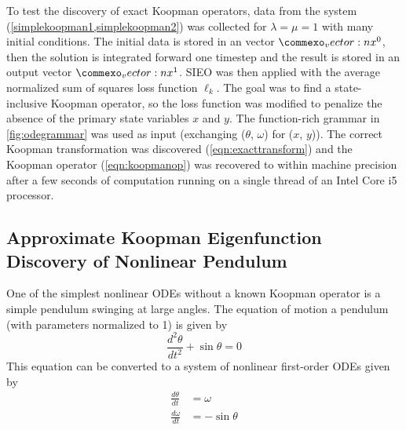 \documentclass{article}
\renewcommand{\vec}[1]{\vect{#1}}
\begin{document}
To test the discovery of exact Koopman operators, data from the system (\cref{simplekoopman1,simplekoopman2}) was collected for $\lambda = \mu = 1$ with many initial conditions. The initial data is stored in an vector $\vec{x}^0$, then the solution is integrated forward one timestep and the result is stored in an output vector $\vec{x}^1$. SIEO was then applied with the average normalized sum of squares loss function $\ell_k$. The goal was to find a state-inclusive Koopman operator, so the loss function was modified to penalize the absence of the primary state variables $x$ and $y$. The function-rich grammar in \cref{fig:odegrammar} was used as input (exchanging ($\theta$, $\omega$) for ($x$, $y$)). The correct Koopman transformation was discovered (\cref{eqn:exacttransform}) and the Koopman operator (\cref{eqn:koopmanop}) was recovered to within machine precision after a few seconds of computation running on a single thread of an Intel Core i5 processor.


\subsection{Approximate Koopman Eigenfunction Discovery of Nonlinear Pendulum}
One of the simplest nonlinear ODEs without a known Koopman operator is a simple pendulum swinging at large angles. The equation of motion a pendulum (with parameters normalized to 1) is given by
\begin{equation}
\frac{d^2 \theta}{d t^2} + \sin \theta = 0 \end{equation}
This equation can be converted to a system of nonlinear first-order ODEs given by
\begin{align}
\frac{d\theta}{dt} &= \omega \\
\frac{d\omega}{dt} &= -\sin \theta
\end{align}
\end{document}
